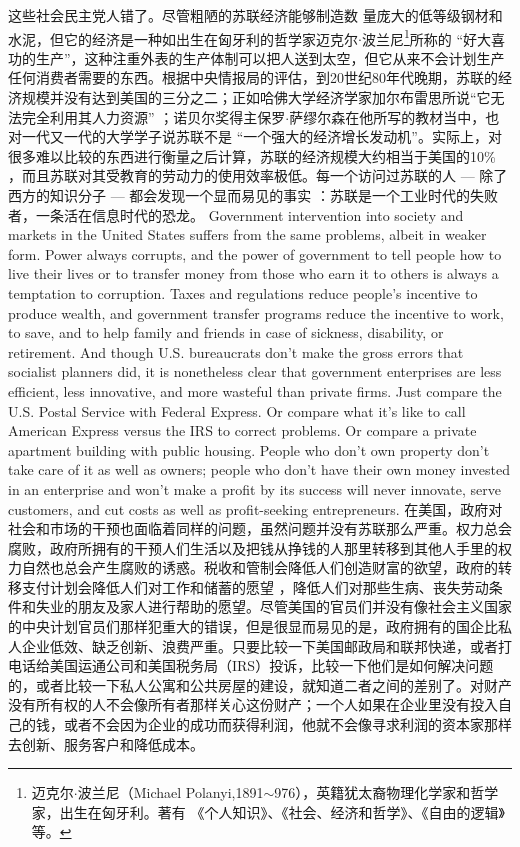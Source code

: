 \begin{paracol}{2}
\switchcolumn
这些社会民主党人错了。尽管粗陋的苏联经济能够制造数
量庞大的低等级钢材和水泥，但它的经济是一种如出生在匈牙利的哲学家迈克尔$\cdot$波兰尼\footnote{迈克尔$\cdot$波兰尼（Michael Polanyi,1891$\sim$976），英籍犹太裔物理化学家和哲学家，出生在匈牙利。著有 《个人知识》、《社会、经济和哲学》、《自由的逻辑》等。}所称的 “好大喜功的生产”，这种注重外表的生产体制可以把人送到太空，但它从来不会计划生产任何消费者需要的东西。根据中央情报局的评估，到20世纪80年代晚期，苏联的经济规模并没有达到美国的三分之二；正如哈佛大学经济学家加尔布雷思所说“它无法完全利用其人力资源” ；诺贝尔奖得主保罗$\cdot$萨缪尔森在他所写的教材当中，也对一代又一代的大学学子说苏联不是 “一个强大的经济增长发动机”。实际上，对很多难以比较的东西进行衡量之后计算，苏联的经济规模大约相当于美国的10\% ，而且苏联对其受教育的劳动力的使用效率极低。每一个访问过苏联的人 --- 除了西方的知识分子 --- 都会发现一个显而易见的事实 ：苏联是一个工业时代的失败者，一条活在信息时代的恐龙。
\switchcolumn*
Government intervention into society and markets in the
United States suffers from the same problems, albeit in weaker
form. Power always corrupts, and the power of government to
tell people how to live their lives or to transfer money from those
who earn it to others is always a temptation to corruption. Taxes
and regulations reduce people's incentive to produce wealth, and
government transfer programs reduce the incentive to work, to
save, and to help family and friends in case of sickness, disability,
or retirement. And though U.S. bureaucrats don't make the gross
errors that socialist planners did, it is nonetheless clear that government enterprises are less efficient, less innovative, and more
wasteful than private firms. Just compare the U.S. Postal Service
with Federal Express. Or compare what it's like to call American
Express versus the IRS to correct problems. Or compare a private
apartment building with public housing. People who don't own
property don't take care of it as well as owners; people who don't
have their own money invested in an enterprise and won't make
a profit by its success will never innovate, serve customers, and
cut costs as well as profit-seeking entrepreneurs.
\switchcolumn
在美国，政府对社会和市场的干预也面临着同样的问题，虽然问题并没有苏联那么严重。权力总会腐败，政府所拥有的干预人们生活以及把钱从挣钱的人那里转移到其他人手里的权力自然也总会产生腐败的诱惑。税收和管制会降低人们创造财富的欲望，政府的转移支付计划会降低人们对工作和储蓄的愿望 ，降低人们对那些生病、丧失劳动条件和失业的朋友及家人进行帮助的愿望。尽管美国的官员们并没有像社会主义国家的中央计划官员们那样犯重大的错误，但是很显而易见的是，政府拥有的国企比私人企业低效、缺乏创新、浪费严重。只要比较一下美国邮政局和联邦快递，或者打电话给美国运通公司和美国税务局（IRS）投诉，比较一下他们是如何解决问题的，或者比较一下私人公寓和公共房屋的建设，就知道二者之间的差别了。对财产没有所有权的人不会像所有者那样关心这份财产；一个人如果在企业里没有投入自己的钱，或者不会因为企业的成功而获得利润，他就不会像寻求利润的资本家那样去创新、服务客户和降低成本。

\end{paracol}
